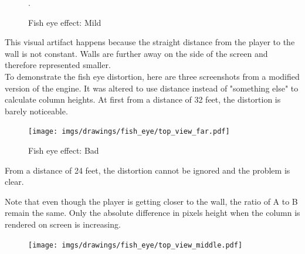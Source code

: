\begin{minipage}{\textwidth}

    \begin{figure}[H]
    \centering
     \caption{Fish eye effect: Mild}. \label{fig:mips}
     \end{figure} 


    \begin{minipage}{.4\textwidth}
    This visual artifact happens because the straight distance from the player to the wall is not constant. Walls are further away on the side of the screen and therefore represented smaller.\\
    To demonstrate the fish eye distortion, here are three screenshots from a modified version of the engine. It was altered to use distance  instead of "something else" to calculate column heights. At first from a distance of 32 feet, the distortion is barely noticeable.\\
     \end{minipage}
    \begin{minipage}{.6\textwidth}
    \begin{figure}[H]
      \begin{flushright}
     \texttt{[image: imgs/drawings/fish\_eye/top\_view\_far.pdf]}
       \end{flushright}
    \end{figure}
    \end{minipage}
\end{minipage}
\par



\begin{minipage}{\textwidth}
\begin{figure}[H]
\centering
 \caption{Fish eye effect: Bad} \label{fig:mips}
 \end{figure}
\begin{minipage}{.4\textwidth}
From a distance of 24 feet, the distortion cannot be ignored and the problem is clear.\\
\par
Note that even though the player is getting closer to the wall, the ratio of A to B remain the same. Only the absolute difference in pixels height when the column is rendered on screen is increasing.
 \end{minipage}
\begin{minipage}{.6\textwidth}
\begin{figure}[H]
  \begin{flushright}
 \texttt{[image: imgs/drawings/fish\_eye/top\_view\_middle.pdf]}
 \end{flushright}
\end{figure}
\end{minipage}
\end{minipage}




